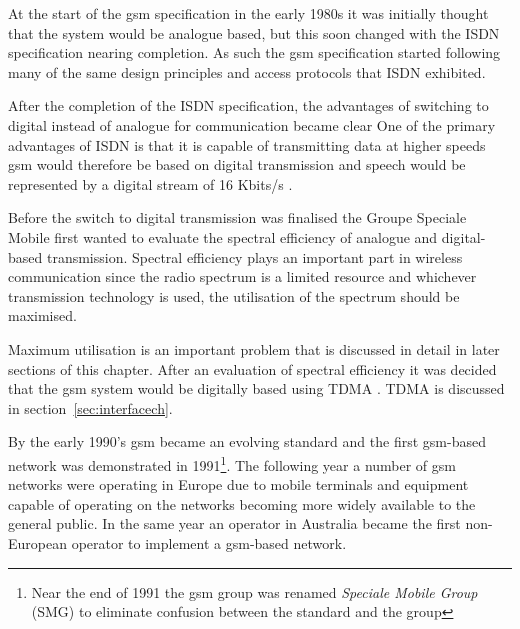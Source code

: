 At the start of the \gls{gsm} specification in the early 1980s it was initially thought that the system would be analogue based, but this soon changed with the \gls{ISDN} specification nearing completion\cite{GSM92}. As such the \gls{gsm} specification started following many of the same design principles and access protocols that \gls{ISDN} exhibited\cite{GSM92}.

After the completion of the \gls{ISDN} specification, the advantages of switching to digital instead of analogue for communication became clear\cite{GSM92} One of the primary advantages of \gls{ISDN} is that it is capable of transmitting data at higher speeds\cite{GSM92} \gls{gsm} would therefore be based on digital transmission and speech would be represented by a digital stream of 16 Kbits/s \cite{GSM92}.

Before the switch to digital transmission was finalised the Groupe Speciale Mobile first wanted to evaluate the spectral efficiency of analogue and digital-based transmission\cite{GSM92}. Spectral efficiency plays an important part in wireless communication since the radio spectrum is a limited resource and whichever transmission technology is used, the utilisation of the spectrum should be maximised\cite{GSM92}. 

Maximum utilisation is an important problem that is discussed in detail in later sections of this chapter. After an evaluation of spectral efficiency it was decided that the \gls{gsm} system would be digitally based using \gls{TDMA} \cite{GSM92,GSMSysEngin}. \gls{TDMA} is discussed in section~\ref{sec:interfacech}.

By the early 1990’s \gls{gsm} became an evolving standard and the first \gls{gsm}-based network was demonstrated in 1991\footnote{Near the end of 1991 the \gls{gsm} group was renamed \emph{Speciale Mobile Group} (SMG) to eliminate confusion between the standard and the group}\cite{GSMArchitectureProtocolsServices,Eisenblatter}. The following year a number of \gls{gsm} networks were operating in Europe due to mobile terminals and equipment capable of operating on the networks becoming more widely available to the general public\cite{GSM92,Eisenblatter}. In the same year an operator in Australia became the first non-European operator to implement a \gls{gsm}-based network\cite{Eisenblatter}.

